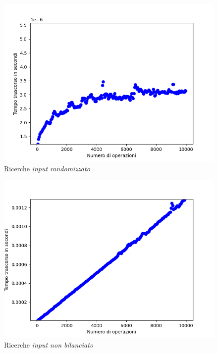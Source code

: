 \documentclass{article}
\begin{document}
			\begin{figure}[h!]
				\centering
				\includegraphics[scale = 0.8]{BST_Searches}
				\caption{Ricerche \textit{input randomizzato}}
			\end{figure}
			\begin{figure}[h!]
				\centering
				\includegraphics[scale = 0.8]{BST_Unbalanced_Searches}
				\caption{Ricerche \textit{input non bilanciato}}
			\end{figure}
\end{document}
